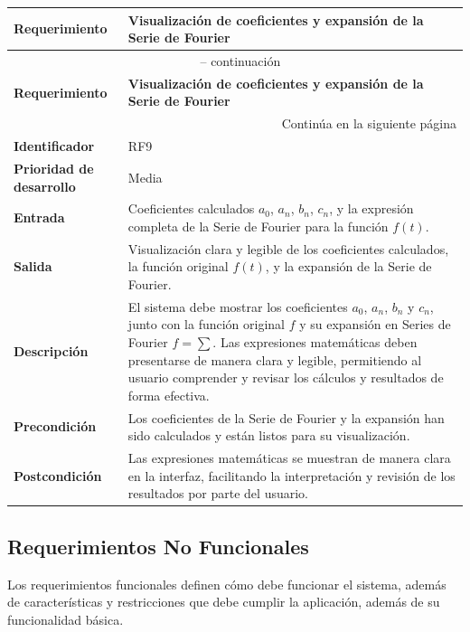 \begin{longtable}{|m{3.5cm}|m{9.5cm}|}
	\hline
	\rowcolor{black!75} \color{white}\textbf{Requerimiento} & \color{white}\textbf{Visualización de coeficientes y expansión de la Serie de Fourier} \\
	\hline
	\endfirsthead
	\multicolumn{2}{c}{{\tablename\ \thetable{} -- continuación}} \\
	\hline
	\rowcolor{black!75} \color{white}\textbf{Requerimiento} & \color{white}\textbf{Visualización de coeficientes y expansión de la Serie de Fourier} \\
	\hline
	\endhead
	\hline \multicolumn{2}{r}{{Continúa en la siguiente página}} \\
	\endfoot
	\hline
	\endlastfoot
	
	\textbf{Identificador} & RF9 \\
	\hline
	\textbf{Prioridad de desarrollo} & Media \\
	\hline
	\textbf{Entrada} & Coeficientes calculados \( a_0 \), \( a_n \), \( b_n \), \( c_n \), y la expresión completa de la Serie de Fourier para la función \( f(t) \). \\
	\hline
	\textbf{Salida} & Visualización clara y legible de los coeficientes calculados, la función original \( f(t) \), y la expansión de la Serie de Fourier. \\
	\hline
	\textbf{Descripción} & El sistema debe mostrar los coeficientes \( a_0 \), \( a_n \), \( b_n \) y \( c_n \), junto con la función original \( f \) y su expansión en Series de Fourier $f = \sum$. Las expresiones matemáticas deben presentarse de manera clara y legible, permitiendo al usuario comprender y revisar los cálculos y resultados de forma efectiva. \\
	\hline
	\textbf{Precondición} & Los coeficientes de la Serie de Fourier y la expansión han sido calculados y están listos para su visualización. \\
	\hline
	\textbf{Postcondición} & Las expresiones matemáticas se muestran de manera clara en la interfaz, facilitando la interpretación y revisión de los resultados por parte del usuario. \\
	\hline
\end{longtable}
\caption{Requerimiento funcional No. 9} \label{tabla:RF9}
\vspace{0.5cm}



\subsection{Requerimientos No Funcionales}
Los requerimientos funcionales definen cómo debe funcionar el sistema, además de características y restricciones que debe cumplir la aplicación, además de su funcionalidad básica.

